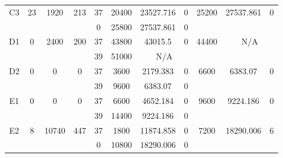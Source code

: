 \begin{sidewaystable}
\begin{tabular}{c||c|c|c||c|c|c|c||c|c|c}
         &
        
      \\
      \hline
      \multirow{2}{*}{C3} &
      \multirow{2}{*}{23} &
      \multirow{2}{*}{1920} &
      \multirow{2}{*}{213} &
      37 &
      20400 &
        23527.716 &
        0 &
      \multirow{2}{*}{25200} &
        \multirow{2}{*}{27537.861} &
        \multirow{2}{*}{0}
      \\
      \cline{5-8}
       &
       &
       &
       &
      0 &
      25800 &
        27537.861 &
        0 &
      
         &
        
      \\
      \hline
      \multirow{2}{*}{D1} &
      \multirow{2}{*}{0} &
      \multirow{2}{*}{2400} &
      \multirow{2}{*}{200} &
      37 &
      43800 &
        43015.5 &
        0 &
      \multirow{2}{*}{44400} &
        \multicolumn{2}{c}{\multirow{2}{*}{N/A}}
      \\
      \cline{5-8}
       &
       &
       &
       &
      39 &
      51000 &
        \multicolumn{2}{|c||}{N/A} &
      
        
      \\
      \hline
      \multirow{2}{*}{D2} &
      \multirow{2}{*}{0} &
      \multirow{2}{*}{0} &
      \multirow{2}{*}{0} &
      37 &
      3600 &
        2179.383 &
        0 &
      \multirow{2}{*}{6600} &
        \multirow{2}{*}{6383.07} &
        \multirow{2}{*}{0}
      \\
      \cline{5-8}
       &
       &
       &
       &
      39 &
      9600 &
        6383.07 &
        0 &
      
         &
        
      \\
      \hline
      \multirow{2}{*}{E1} &
      \multirow{2}{*}{0} &
      \multirow{2}{*}{0} &
      \multirow{2}{*}{0} &
      37 &
      6600 &
        4652.184 &
        0 &
      \multirow{2}{*}{9600} &
        \multirow{2}{*}{9224.186} &
        \multirow{2}{*}{0}
      \\
      \cline{5-8}
       &
       &
       &
       &
      39 &
      14400 &
        9224.186 &
        0 &
      
         &
        
      \\
      \hline
      \multirow{2}{*}{E2} &
      \multirow{2}{*}{8} &
      \multirow{2}{*}{10740} &
      \multirow{2}{*}{447} &
      37 &
      1800 &
        11874.858 &
        0 &
      \multirow{2}{*}{7200} &
        \multirow{2}{*}{18290.006} &
        \multirow{2}{*}{6}
      \\
      \cline{5-8}
       &
       &
       &
       &
      0 &
      10800 &
        18290.006 &
        0 &
      

\end{tabular}
\end{sidewaystable}

